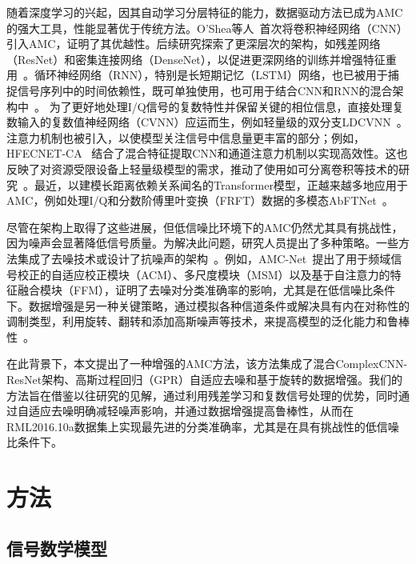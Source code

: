 \documentclass[conference]{IEEEtran}
\begin{document}
随着深度学习的兴起，因其自动学习分层特征的能力，数据驱动方法已成为AMC的强大工具，性能显著优于传统方法。O'Shea等人~\cite{oshea2016convolutional}首次将卷积神经网络（CNN）引入AMC，证明了其优越性。后续研究探索了更深层次的架构，如残差网络（ResNet）和密集连接网络（DenseNet），以促进更深网络的训练并增强特征重用~\cite{west2017deep, patil2021automatic}。循环神经网络（RNN），特别是长短期记忆（LSTM）网络，也已被用于捕捉信号序列中的时间依赖性，既可单独使用，也可用于结合CNN和RNN的混合架构中~\cite{rajendran2018deep, xu2020spatiotemporal}。
为了更好地处理I/Q信号的复数特性并保留关键的相位信息，直接处理复数输入的复数值神经网络（CVNN）应运而生，例如轻量级的双分支LDCVNN~\cite{xu2025ldcvnn}。注意力机制也被引入，以使模型关注信号中信息量更丰富的部分；例如，HFECNET-CA~\cite{ma2023hfecnetca} 结合了混合特征提取CNN和通道注意力机制以实现高效性。这也反映了对资源受限设备上轻量级模型的需求，推动了使用如可分离卷积等技术的研究~\cite{guo2024ulcnn, ma2023hfecnetca, xu2025ldcvnn}。最近，以建模长距离依赖关系闻名的Transformer模型，正越来越多地应用于AMC，例如处理I/Q和分数阶傅里叶变换（FRFT）数据的多模态AbFTNet~\cite{ning2024abftnet}。

尽管在架构上取得了这些进展，但低信噪比环境下的AMC仍然尤其具有挑战性，因为噪声会显著降低信号质量。为解决此问题，研究人员提出了多种策略。一些方法集成了去噪技术或设计了抗噪声的架构~\cite{yao2019modulation}。例如，AMC-Net~\cite{zhang2023amcnet}提出了用于频域信号校正的自适应校正模块（ACM）、多尺度模块（MSM）以及基于自注意力的特征融合模块（FFM），证明了去噪对分类准确率的影响，尤其是在低信噪比条件下。数据增强是另一种关键策略，通过模拟各种信道条件或解决具有内在对称性的调制类型，利用旋转、翻转和添加高斯噪声等技术，来提高模型的泛化能力和鲁棒性~\cite{zhang2023efficient}。

在此背景下，本文提出了一种增强的AMC方法，该方法集成了混合ComplexCNN-ResNet架构、高斯过程回归（GPR）自适应去噪和基于旋转的数据增强。我们的方法旨在借鉴以往研究的见解，通过利用残差学习和复数信号处理的优势，同时通过自适应去噪明确减轻噪声影响，并通过数据增强提高鲁棒性，从而在RML2016.10a数据集上实现最先进的分类准确率，尤其是在具有挑战性的低信噪比条件下。




\section{方法}

\subsection{信号数学模型}
\end{document}
